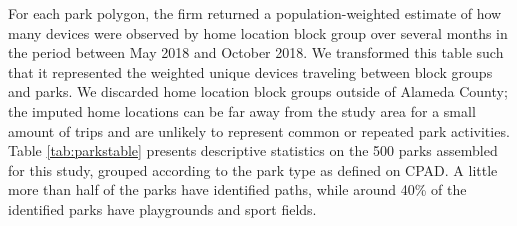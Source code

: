 \documentclass[3p, authoryear, review]{elsarticle} %
\begin{document}
For each park polygon, the firm returned a population-weighted estimate of how
many devices were observed by home location block group over several months in
the period between May 2018 and October 2018. We transformed this table such
that it represented the weighted unique devices traveling between block groups
and parks. We discarded home location block groups outside of Alameda County;
the imputed home locations can be far away from the study area for a small
amount of trips and are unlikely to represent common or repeated park
activities. Table \ref{tab:parkstable} presents descriptive statistics on
the 500 parks assembled for this study, grouped according to the
park type as defined on CPAD. A little more than half of the parks have
identified paths, while around 40\% of the identified parks have playgrounds and
sport fields.
\end{document}
